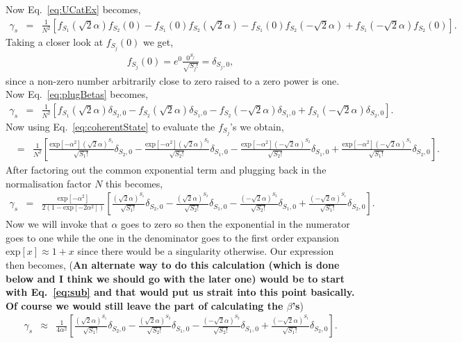 \documentclass[aps,pra,singlecolumn,amsmath,amssymb,nofootinbib,superscriptaddress]{revtex4}
\begin{document}
Now Eq.~\ref{eq:UCatEx} becomes,
\begin{eqnarray} \label{eq:plugBetas}
\gamma_s &=& \frac{1}{N^2} \left[f_{S_1}(\sqrt{2}\alpha) f_{S_2}(0)- f_{S_1}(0) f_{S_2}(\sqrt{2}\alpha)- f_{S_1}(0) f_{S_2}(-\sqrt{2}\alpha)+ f_{S_1}(-\sqrt{2}\alpha) f_{S_2}(0)\right].
\end{eqnarray}
Taking a closer look at $f_{S_j}(0)$ we get, 
\begin{eqnarray}
f_{S_j}(0)=e^0 \frac{0^{S_j}}{\sqrt{S_j!}}= \delta_{S_j,0},
\end{eqnarray}
since a non-zero number arbitrarily close to zero raised to a zero power is one. Now Eq.~\ref{eq:plugBetas} becomes,
\begin{eqnarray}
\gamma_s &=& \frac{1}{N^2} \left[
f_{S_1}(\sqrt{2}\alpha)\delta_{S_2,0}
-f_{S_2}(\sqrt{2}\alpha)\delta_{S_1,0}
-f_{S_2}(-\sqrt{2}\alpha)\delta_{S_1,0}
+f_{S_1}(-\sqrt{2}\alpha) \delta_{S_2,0} \right].
\end{eqnarray}
Now using Eq.~\ref{eq:coherentState} to evaluate the $f_{S_j}$'s we obtain,
\begin{eqnarray}
&=& \frac{1}{N^2} \left[ 
\frac{\mathrm{exp}[-\alpha^2](\sqrt{2}\alpha)^{S_1}}{\sqrt{S_1!}}\delta_{S_2,0}
-\frac{\mathrm{exp}[-\alpha^2](\sqrt{2}\alpha)^{S_2}}{\sqrt{S_2!}}\delta_{S_1,0}
-\frac{\mathrm{exp}[-\alpha^2](-\sqrt{2}\alpha)^{S_2}}{\sqrt{S_2!}}\delta_{S_1,0}
+\frac{\mathrm{exp}[-\alpha^2](-\sqrt{2}\alpha)^{S_1}}{\sqrt{S_1!}}\delta_{S_2,0} \right].
\end{eqnarray}
After factoring out the common exponential term and plugging back in the normalisation factor $N$ this becomes,
\begin{eqnarray}
\gamma_s &=& \frac{\mathrm{exp}[-\alpha^2]}{2(1-\mathrm{exp}[-2\alpha^2])} \left[ 
\frac{(\sqrt{2}\alpha)^{S_1}}{\sqrt{S_1!}}\delta_{S_2,0}
-\frac{(\sqrt{2}\alpha)^{S_2}}{\sqrt{S_2!}}\delta_{S_1,0}
-\frac{(-\sqrt{2}\alpha)^{S_2}}{\sqrt{S_2!}}\delta_{S_1,0}
+\frac{(-\sqrt{2}\alpha)^{S_1}}{\sqrt{S_1!}}\delta_{S_2,0} \right].
\end{eqnarray}
Now we will invoke that $\alpha$ goes to zero so then the exponential in the numerator goes to one while the one in the denominator goes to the first order expansion $\mathrm{exp}[x]\approx1+x$ since there would be a singularity otherwise. Our expression then becomes, (\textbf{An alternate way to do this calculation (which is done below and I think we should go with the later one) would be to start with Eq.~\ref{eq:sub} and that would put us strait into this point basically. Of course we would still leave the part of calculating the $\beta$'s})
\begin{eqnarray}  \label{eq:2InputSmallAlpha}
\gamma_s &\approx& \frac{1}{4\alpha^2} \left[ 
\frac{(\sqrt{2}\alpha)^{S_1}}{\sqrt{S_1!}}\delta_{S_2,0}
-\frac{(\sqrt{2}\alpha)^{S_2}}{\sqrt{S_2!}}\delta_{S_1,0}
-\frac{(-\sqrt{2}\alpha)^{S_2}}{\sqrt{S_2!}}\delta_{S_1,0}
+\frac{(-\sqrt{2}\alpha)^{S_1}}{\sqrt{S_1!}}\delta_{S_2,0} \right].
\end{eqnarray}
\end{document}

